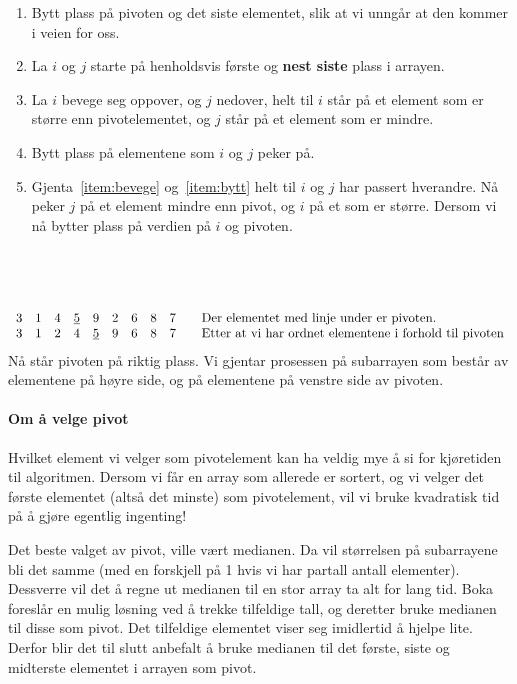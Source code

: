 \begin{enumerate}
\item Bytt plass på pivoten og det siste elementet, slik at vi unngår at den
  kommer i veien for oss.
\item La $i$ og $j$ starte på henholdsvis første og \textbf{nest siste} plass i
  arrayen. 
\item\label{item:bevege} La $i$ bevege seg oppover, og $j$ nedover, helt til $i$ står på et
  element som er større enn pivotelementet, og $j$ står på et element som er
  mindre.
\item\label{item:bytt} Bytt plass på elementene som $i$ og $j$ peker på.
\item Gjenta~\ref{item:bevege} og~\ref{item:bytt} helt til $i$ og $j$ har
  passert hverandre. Nå peker $j$ på et element mindre enn pivot, og $i$ på et
  som er større. Dersom vi nå bytter plass på verdien på $i$ og pivoten.
\end{enumerate}
~\\
\begin{example} ~\newline
\[
  \begin{array}{c c c c c c c c c l}
    3&1&4&\underline{5}&9&2&6&8&7 &\quad \text{Der elementet med linje under er pivoten.}\\
    3&1&2&4&\underline{5}&9&6&8&7 &\quad \text{Etter at vi har ordnet elementene
    i forhold til pivoten}
  \end{array}
\]
Nå står pivoten på riktig plass. Vi gjentar prosessen på subarrayen som består
av elementene på høyre side, og på elementene på venstre side av pivoten.
\end{example}

\paragraph{Om å velge pivot}
Hvilket element vi velger som pivotelement kan ha veldig mye å si for kjøretiden
til algoritmen. Dersom vi får en array som allerede er sortert, og vi velger det
første elementet (altså det minste) som pivotelement, vil vi bruke kvadratisk
tid på å gjøre egentlig ingenting!

Det beste valget av pivot, ville vært medianen. Da vil størrelsen på
subarrayene bli det samme (med en forskjell på 1 hvis vi har partall antall
elementer). Dessverre vil det å regne ut medianen til en stor array ta alt for
lang tid. Boka foreslår en mulig løsning ved å trekke tilfeldige tall, og
deretter bruke medianen til disse som pivot. Det tilfeldige elementet viser seg
imidlertid å hjelpe lite. Derfor blir det til slutt anbefalt å bruke medianen
til det første, siste og midterste elementet i arrayen som pivot.


